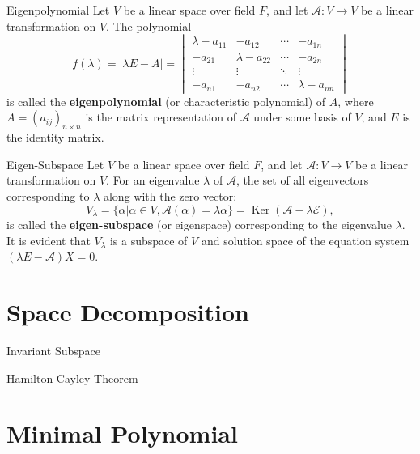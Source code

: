\documentclass[11pt]{../../TexTemplate/elegantbook} %
\begin{document}
\begin{definition}{Eigenpolynomial}
    Let \( V \) be a linear space over field \( F \), 
    and let \( \mathcal{A}: V \to V \) be a linear transformation on \( V \).
    The polynomial
    \[
    f(\lambda) = |\lambda E - A| = \begin{vmatrix}
        \lambda - a_{11} & -a_{12} & \cdots & -a_{1n} \\
        -a_{21} & \lambda - a_{22} & \cdots & -a_{2n} \\
        \vdots & \vdots & \ddots & \vdots \\
        -a_{n1} & -a_{n2} & \cdots & \lambda - a_{nn}
    \end{vmatrix}
    \]
    is called the \textbf{eigenpolynomial} (or characteristic polynomial) of \( A \),
    where \( A = (a_{ij})_{n\times n} \) is the matrix representation of \( \mathcal{A} \)
    under some basis of \( V \), and \( E \) is the identity matrix.
\end{definition}


\begin{definition}{Eigen-Subspace}
    Let \( V \) be a linear space over field \( F \), 
    and let \( \mathcal{A}: V \to V \) be a linear transformation on \( V \).
    For an eigenvalue \( \lambda \) of \( \mathcal{A} \), 
    the set of all eigenvectors corresponding to \( \lambda \) \underline{along with the zero vector}:
    \[
    V_{\lambda} = \{ \alpha | \alpha \in V, \mathcal{A}(\alpha) = \lambda \alpha \} = 
    \operatorname{Ker}(\mathcal{A} - \lambda \mathcal{E}),
    \]
    is called the \textbf{eigen-subspace} (or eigenspace) corresponding to the eigenvalue \( \lambda \).
    It is evident that \( V_{\lambda} \) is a subspace of \( V \)
    and solution space of the equation system \( ( \lambda E - \mathcal{A})X = 0 \).
\end{definition}




\section{Space Decomposition}

\begin{leftbarTitle}{Invariant Subspace}\end{leftbarTitle}

\begin{leftbarTitle}{Hamilton-Cayley Theorem}\end{leftbarTitle}

\section{Minimal Polynomial}
\end{document}
